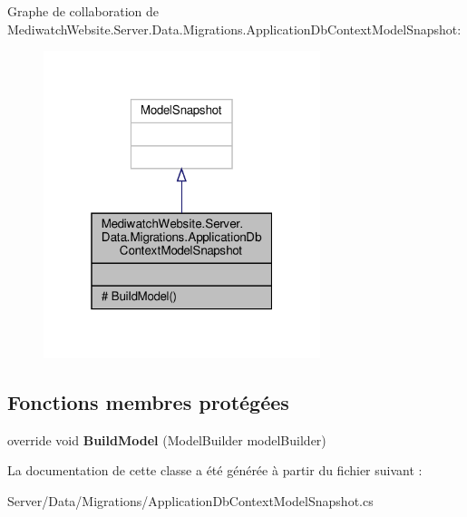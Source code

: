 Graphe de collaboration de Mediwatch\+Website.\+Server.\+Data.\+Migrations.\+Application\+Db\+Context\+Model\+Snapshot\+:\nopagebreak
\begin{figure}[H]
\begin{center}
\leavevmode
\includegraphics[width=229pt]{class_mediwatch_website_1_1_server_1_1_data_1_1_migrations_1_1_application_db_context_model_snapshot__coll__graph}
\end{center}
\end{figure}
\subsection*{Fonctions membres protégées}
\begin{DoxyCompactItemize}
\item 
\mbox{\label{class_mediwatch_website_1_1_server_1_1_data_1_1_migrations_1_1_application_db_context_model_snapshot_a2cb0055d80d12c9613b87de79eb330fb}} 
override void {\bfseries Build\+Model} (Model\+Builder model\+Builder)
\end{DoxyCompactItemize}


La documentation de cette classe a été générée à partir du fichier suivant \+:\begin{DoxyCompactItemize}
\item 
Server/\+Data/\+Migrations/Application\+Db\+Context\+Model\+Snapshot.\+cs\end{DoxyCompactItemize}
